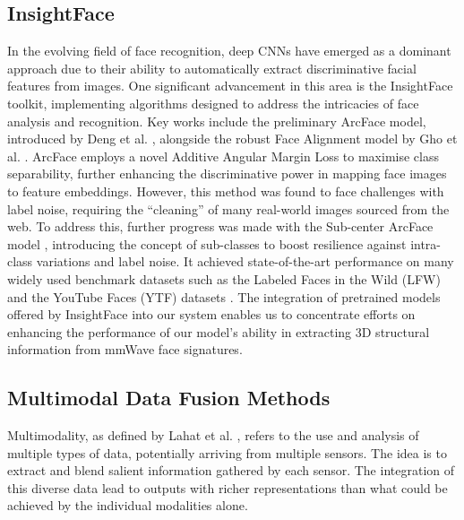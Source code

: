 \documentclass{mpaper}
\begin{document}
\subsection{InsightFace}
\label{background:insightface}
In the evolving field of face recognition, deep CNNs have emerged as a dominant approach due to their ability to automatically extract discriminative facial features from images. One significant advancement in this area is the InsightFace toolkit, implementing algorithms designed to address the intricacies of face analysis and recognition. Key works include the preliminary ArcFace model, introduced by Deng et al. \cite{deng2018arcface}, alongside the robust Face Alignment model by Gho et al. \cite{guo2018stacked}. ArcFace employs a novel Additive Angular Margin Loss to maximise class separability, further enhancing the discriminative power in mapping face images to feature embeddings. However, this method was found to face challenges with label noise, requiring the ``cleaning'' of many real-world images sourced from the web. To address this, further progress was made with the Sub-center ArcFace model \cite{deng2020subcenter}, introducing the concept of sub-classes to boost resilience against intra-class variations and label noise. It achieved state-of-the-art performance on many widely used benchmark datasets such as the Labeled Faces in the Wild (LFW) \cite{huang2008labeled} and the YouTube Faces (YTF) datasets \cite{wolf2011face}. The integration of pretrained models offered by InsightFace into our system enables us to concentrate efforts on enhancing the performance of our model's ability in extracting 3D structural information from mmWave face signatures. 


\subsection{Multimodal Data Fusion Methods}
Multimodality, as defined by Lahat et al. \cite{lahat2015multimodal}, refers to the use and analysis of multiple types of data, potentially arriving from multiple sensors. The idea is to extract and blend salient information gathered by each sensor. The integration of this diverse data lead to outputs with richer representations than what could be achieved by the individual modalities alone. 
\end{document}
